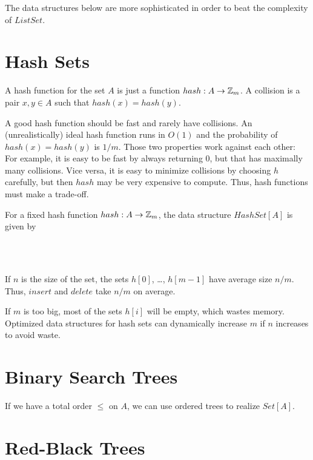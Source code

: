 The data structures below are more sophisticated in order to beat the complexity of $ListSet$.

\section{Hash Sets}

A hash function for the set $A$ is just a function $hash:A\to \mathbb{Z}_m$.
A collision is a pair $x,y\in A$ such that $hash(x)=hash(y)$.

A good hash function should be fast and rarely have collisions.
An (unrealistically) ideal hash function runs in $O(1)$ and the probability of $hash(x)=hash(y)$ is $1/m$.
Those two properties work against each other: For example, it is easy to be fast by always returning $0$, but that has maximally many collisions.
Vice versa, it is easy to minimize collisions by choosing $h$ carefully, but then $hash$ may be very expensive to compute.
Thus, hash functions must make a trade-off.

For a fixed hash function $hash:A\to \mathbb{Z}_m$, the data structure $HashSet[A]$ is given by
\begin{acode}
\\
\\
\end{acode}

If $n$ is the size of the set, the sets $h[0]$, \ldots, $h[m-1]$ have average size $n/m$.
Thus, $insert$ and $delete$ take $n/m$ on average.
\medskip

If $m$ is too big, most of the sets $h[i]$ will be empty, which wastes memory.
Optimized data structures for hash sets can dynamically increase $m$ if $n$ increases to avoid waste.

\section{Binary Search Trees}

If we have a total order $\leq$ on $A$, we can use ordered trees to realize $Set[A]$.

\section{Red-Black Trees}

